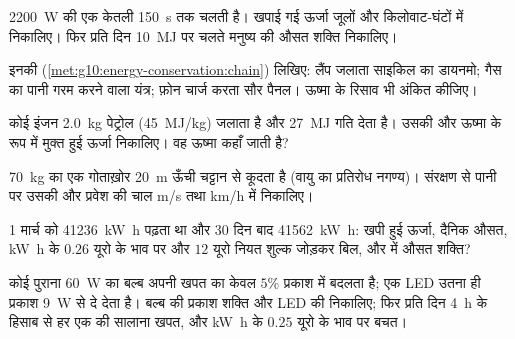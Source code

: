 \begin{exercise}[$\star$]\label{exo:g10:energy-conservation:4}
\qty{2200}{W} की एक केतली \qty{150}{s} तक चलती है। खपाई गई ऊर्जा
जूलों और किलोवाट-घंटों में निकालिए। फिर प्रति दिन
\qty{10}{MJ} पर चलते मनुष्य की औसत शक्ति निकालिए।
\end{exercise}

\begin{exercise}[$\star$]\label{exo:g10:energy-conservation:5}
इनकी  (\cref{met:g10:energy-conservation:chain}) लिखिए: लैंप जलाता साइकिल का
डायनमो; गैस का पानी गरम करने वाला यंत्र; फ़ोन चार्ज करता सौर पैनल।
ऊष्मा के रिसाव भी अंकित कीजिए।
\end{exercise}

\begin{exercise}[$\star\star$]\label{exo:g10:energy-conservation:6}
कोई इंजन \qty{2.0}{kg} पेट्रोल (\qty{45}{MJ/kg}) जलाता है और \qty{27}{MJ} गति देता है।
उसकी  और ऊष्मा के रूप में मुक्त हुई ऊर्जा
निकालिए। वह ऊष्मा कहाँ जाती है?
\end{exercise}

\begin{exercise}[$\star\star$]\label{exo:g10:energy-conservation:7}
\qty{70}{kg} का एक गोताख़ोर \qty{20}{m} ऊँची चट्टान से कूदता है (वायु का
प्रतिरोध नगण्य)। संरक्षण से पानी पर उसकी  और प्रवेश
की चाल \unit{m/s} तथा \unit{km/h} में निकालिए।
\end{exercise}

\begin{exercise}[$\star\star$]\label{exo:g10:energy-conservation:8}
1 मार्च को  \qty{41236}{kW.h} पढ़ता था और 30 दिन बाद \qty{41562}{kW.h}: खपी हुई
ऊर्जा, दैनिक औसत, \unit{kW.h} के $0.26$ यूरो के भाव पर और $12$
यूरो नियत शुल्क जोड़कर बिल, और  में औसत शक्ति?
\end{exercise}

\begin{exercise}[$\star\star$]\label{exo:g10:energy-conservation:9}
कोई पुराना \qty{60}{W} का बल्ब अपनी खपत का केवल $5\%$ प्रकाश में बदलता
है; एक LED उतना ही प्रकाश \qty{9}{W} से दे देता है। बल्ब की प्रकाश
शक्ति और LED की  निकालिए; फिर प्रति दिन \qty{4}{h}
के हिसाब से हर एक की सालाना खपत, और \unit{kW.h} के $0.25$ यूरो के भाव पर
बचत।
\end{exercise}

